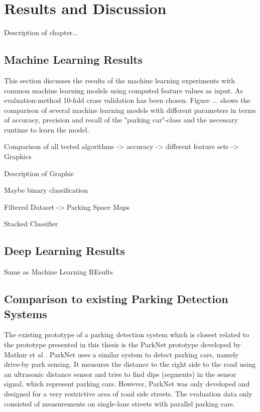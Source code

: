 \chapter{Results and Discussion}
\label{chap:evaluation}

Description of chapter...



\section{Machine Learning Results}

This section discusses the results of the machine learning experiments with common machine learning models using computed feature values as input. As evaluation-method 10-fold cross validation has been chosen. Figure ... shows the comparison of several machine learning models with different parameters in terms of accuracy, precision and recall of the "parking car"-class and the necessary runtime to learn the model.




Comparison of all tested algorithms -> accuracy -> different feature sets -> Graphics

Description of Graphic

Maybe binary classification

Filtered Dataset -> Parking Space Maps

Stacked Classifier


\section{Deep Learning Results}

Same as Machine Learning REsults





\section{Comparison to existing Parking Detection Systems}

The existing prototype of a parking detection system which is closest related to the prototype presented in this thesis is the ParkNet prototype developed by Mathur et al \cite{Mathur:2010:PDS:1814433.1814448}. ParkNet uses a similar system to detect parking cars, namely drive-by park sensing. It measures the distance to the right side to the road using an ultrasonic distance sensor and tries to find dips (segments) in the sensor signal, which represent parking cars. However, ParkNet was only developed and designed for a very restrictive area of road side streets. The evaluation data only consisted of measurements on single-lane streets with parallel parking cars. 

